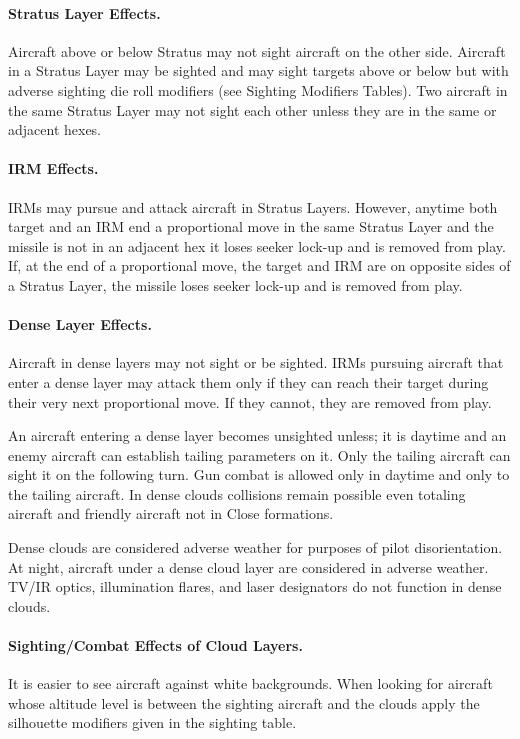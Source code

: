 \paragraph{Stratus Layer Effects.} Aircraft above or below Stratus may not sight aircraft on the other side. Aircraft in a Stratus Layer may be sighted and may sight targets above or below but with adverse sighting die roll modifiers (see Sighting Modifiers Tables). Two aircraft in the same Stratus Layer may not sight each other unless they are in the same or adjacent hexes.

\paragraph{IRM Effects.} IRMs may pursue and attack aircraft in Stratus Layers. However, anytime both target and an IRM end a proportional move in the same Stratus Layer and the missile is not in an adjacent hex it loses seeker lock-up and is removed from play. If, at the end of a proportional move, the target and IRM are on opposite sides of a Stratus Layer, the missile loses seeker lock-up and is removed from play.

\paragraph{Dense Layer Effects.} Aircraft in dense layers may not sight or be sighted. IRMs pursuing aircraft that enter a dense layer may attack them only if they can reach their target during their very next proportional move. If they cannot, they are removed from play.

An aircraft entering a dense layer becomes unsighted unless; it is daytime and an enemy aircraft can establish tailing parameters on it. Only the tailing aircraft can sight it on the following turn. Gun combat is allowed only in daytime and only to the tailing aircraft. In dense clouds collisions remain possible even totaling aircraft and friendly aircraft not in Close formations.

Dense clouds are considered adverse weather for purposes of pilot disorientation. At night, aircraft under a dense cloud layer are considered in adverse weather. TV/IR optics, illumination flares, and laser designators do not function in dense clouds.

\paragraph{Sighting/Combat Effects of Cloud Layers.} It is easier to see aircraft against white backgrounds. When looking for aircraft whose altitude level is between the sighting aircraft and the clouds apply the silhouette modifiers given in the sighting table.

